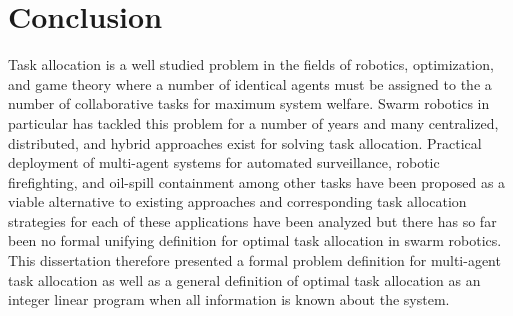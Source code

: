 \documentclass[12pt]{book}
\begin{document}
\chapter{Conclusion}

Task allocation is a well studied problem in the fields of robotics, optimization, and game theory where a number of identical agents must be assigned to the a number of collaborative tasks for maximum system welfare. Swarm robotics in particular has tackled this problem for a number of years and many centralized, distributed, and hybrid approaches exist for solving task allocation. Practical deployment of multi-agent systems for automated surveillance, robotic firefighting, and oil-spill containment among other tasks have been proposed as a viable alternative to existing approaches and corresponding task allocation strategies for each of these applications have been analyzed but there has so far been no formal unifying definition for optimal task allocation in swarm robotics. This dissertation therefore presented a formal problem definition for multi-agent task allocation as well as a general definition of optimal task allocation as an integer linear program when all information is known about the system.
\end{document}
